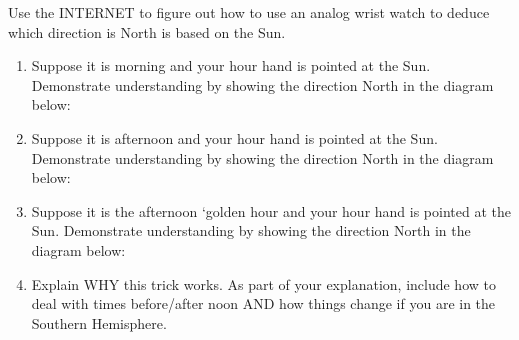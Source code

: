 \documentclass[noauthor,nooutcomes,handout,hints]{ximera}
\begin{document}
\mynewpage




\begin{question}
  Use the INTERNET to figure out how to use an analog wrist watch to
  deduce which direction is North is based on the Sun. 
  \begin{enumerate}
  \item Suppose it is morning and your hour hand is pointed at the
    Sun.  Demonstrate understanding by showing the direction North in
    the diagram below:
    \begin{center}
    \end{center}
     \item Suppose it is afternoon and your hour hand is pointed at
       the Sun. Demonstrate understanding by showing the direction
       North in the diagram below:
    \begin{center}
    \end{center}
  \item Suppose it is the afternoon `golden hour and your hour hand is
    pointed at the Sun. Demonstrate understanding by showing the
    direction North in the diagram below:
    \begin{center}
    \end{center}
  \item Explain WHY this trick works. As part of your explanation,
    include how to deal with times before/after noon AND how things
    change if you are in the Southern Hemisphere.
  \end{enumerate}




  
\end{question}
\end{document}
